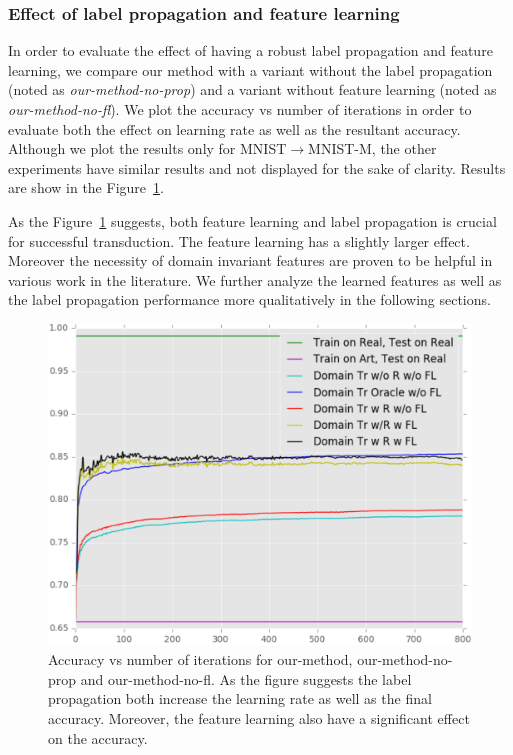 \subsubsection{Effect of label propagation and feature learning}
In order to evaluate the effect of having a robust label propagation and feature learning, we compare our method with a variant without the label propagation (noted as \emph{our-method-no-prop}) and a variant without feature learning (noted as \emph{our-method-no-fl}). We plot the accuracy vs number of iterations in order to evaluate both the effect on learning rate as well as the resultant accuracy. Although we plot the results only for MNIST$\rightarrow$MNIST-M, the other experiments have similar results and not displayed for the sake of clarity. Results are show in the Figure~\ref{fllprop}. 

As the Figure~\ref{fllprop} suggests, both feature learning and label propagation is crucial for successful transduction. The feature learning has a slightly larger effect. Moreover the necessity of domain invariant features are proven to be helpful in various work\cite{ganin15, tzeng14} in the literature. We further analyze the learned features as well as the label propagation performance more qualitatively in the following sections.

\begin{figure}[ht]
\includegraphics[width=\columnwidth]{figure_1fl}
\caption{Accuracy vs number of iterations for our-method, our-method-no-prop and our-method-no-fl. As the figure suggests the label propagation both increase the learning rate as well as the final accuracy. Moreover, the feature learning also have a significant effect on the accuracy.}
\label{fllprop}
\end{figure}

